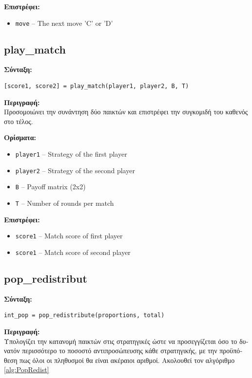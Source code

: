 \documentclass[12pt]{report}
\begin{document}
\textbf{\foreignlanguage{greek}{Επιστρέφει}:}
\begin{itemize}
    \item \texttt{move} – The next move 'C' or 'D'
\end{itemize}

\subsection*{play\_match}

\textbf{\foreignlanguage{greek}{Σύνταξη}:}
\begin{verbatim}
[score1, score2] = play_match(player1, player2, B, T)
\end{verbatim}

\textbf{\foreignlanguage{greek}{Περιγραφή:}} \\
\foreignlanguage{greek}{
Προσομοιώνει την συνάντηση δύο παικτών και επιστρέφει την συγκομιδή του καθενός στο τέλος.}

\textbf{\foreignlanguage{greek}{Ορίσματα:}}
\begin{itemize}
    \item \texttt{player1} – Strategy of the first player
    \item \texttt{player2} – Strategy of the second player
    \item \texttt{B} – Payoff matrix (2x2)
    \item \texttt{T} – Number of rounds per match
\end{itemize}

\textbf{\foreignlanguage{greek}{Επιστρέφει}:}
\begin{itemize}
    \item \texttt{score1} – Match score of first player
    \item \texttt{score1} – Match score of second player
\end{itemize}


\subsection*{pop\_redistribut}

\textbf{\foreignlanguage{greek}{Σύνταξη}:}
\begin{verbatim}
int_pop = pop_redistribute(proportions, total)
\end{verbatim}

\textbf{\foreignlanguage{greek}{Περιγραφή:}} \\
\foreignlanguage{greek}{Υπολογίζει την κατανομή παικτών στις στρατηγικές ώστε να προσεγγίζεται όσο το δυνατόν περισσότερο το ποσοστό αντιπροσώπευσης κάθε στρατηγικής, με την προϋπόθεση πως όλοι οι πληθυσμοί θα είναι ακέραιοι αριθμοί. Ακολουθεί τον αλγόριθμο \ref{alg:PopRedist}}
\end{document}
